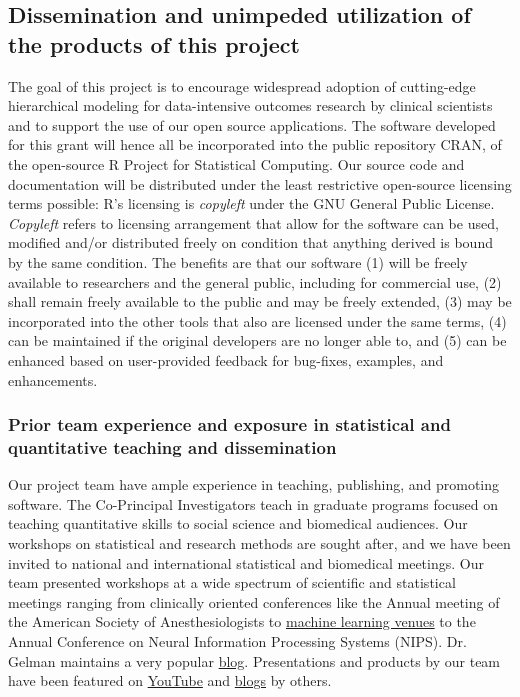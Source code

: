 \documentclass[11pt,notitlepage]{article}
\begin{document}
\subsection*{Dissemination and unimpeded utilization of the products of this project}
The goal of this project is to encourage widespread adoption of cutting-edge 
hierarchical modeling for data-intensive outcomes research by clinical scientists and to support the use of our 
open source applications. The software developed for this grant will hence all be incorporated into the public repository CRAN, 
of the open-source R Project for Statistical Computing. Our source code and documentation 
will be distributed under the least restrictive open-source licensing terms possible: R's licensing is \textit{copyleft} under the 
GNU General Public License. \textit{Copyleft} refers to licensing arrangement that allow for the software can be used, modified and/or 
distributed freely on condition that anything derived is bound by the same condition. The benefits  are that our software 
(1) will be freely available to researchers and the general public, including for commercial use, 
(2) shall remain freely available to the public and may be freely extended, 
(3) may be incorporated into the other tools that also are licensed under the same terms, 
(4) can be maintained if the original developers are no longer able to, and
(5) can be enhanced based on user-provided feedback for bug-fixes, examples, and enhancements.

\subsubsection*{Prior team experience and exposure in statistical and quantitative teaching and dissemination}
Our project team have ample experience in teaching, publishing, and promoting software. The Co-Principal Investigators teach 
in graduate programs focused on teaching quantitative skills to social science and biomedical audiences. 
Our workshops on statistical and research methods are sought after, and we have been invited to national and international statistical and  
biomedical meetings. Our team presented workshops at a wide spectrum of scientific and statistical meetings ranging from clinically oriented 
conferences like the Annual meeting of the American Society of Anesthesiologists to \href{https://www.youtube.com/watch?v=pHsuIaPbNbY}{machine learning venues} 
to the Annual Conference on Neural Information Processing Systems (NIPS). Dr. Gelman maintains a very popular \href{http://andrewgelman.com/}{blog}. 
Presentations and products by our team have been featured on \href{https://www.youtube.com/watch?v=X31xqNHcvQs}{YouTube} and 
\href{http://thinkinator.com/2016/01/12/r-users-will-now-inevitably-become-bayesians/}{blogs} by others.   
\end{document}
